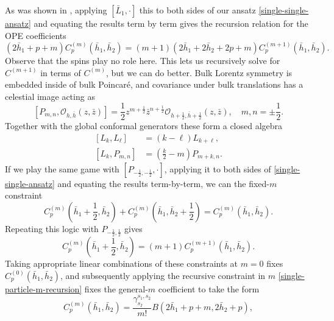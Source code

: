 \documentclass[11pt,letterpaper]{article}
\newcommand{\LP}{\left(}
\newcommand{\RP}{\right)}
\newcommand{\mc}[1]{\mathcal{#1}}
\begin{document}
As was shown in \cite{Himwich:2021dau}, applying $\left[ \bar{L}_1, \cdot \right]$ this to both sides of our ansatz \eqref{single-single-ansatz} and equating the results term by term gives the recursion relation for the OPE coefficients
\begin{equation} \label{single-particle-m-recursion}
\LP 2\bar{h}_1 +p+ m  \RP C_p^{(m)} (\bar{h}_1, \bar{h}_2) = (m +1)(2\bar{h}_1 + 2\bar{h}_2 + 2p + m) C_p^{(m+1)}(\bar{h}_1, \bar{h}_2).
\end{equation} 
Observe that the spins play no role here. This lets us recursively solve for $C^{(m+1)}$ in terms of $C^{(m)}$, but we can do better. Bulk Lorentz symmetry is embedded inside of bulk Poincar\'{e}, and covariance under bulk translations has a celestial image acting as \begin{equation}
\left[ P_{m,n}, \mc{O}_{h, \bar{h}}(z, \bar{z}) \right] = \frac{1}{2} z^{m + \frac{1}{2}} \bar{z}^{n + \frac{1}{2}} \mc{O}_{h + \frac{1}{2}, \bar{h} + \frac{1}{2}} (z, \bar{z}), \quad m, n = \pm \frac{1}{2}.
\end{equation}
Together with the global conformal generators these form a closed algebra \begin{equation}
\begin{aligned}
[L_k, L_\ell] & = (k - \ell)L_{k + \ell}, \\
[L_k, P_{m,n}] & = \LP \frac{k}{2} - m \RP P_{m+k, n}.
\end{aligned}
\end{equation}
If we play the same game with $\left[ P_{- \frac{1}{2}, - \frac{1}{2}}, \cdot \right]$, applying it to both sides of \eqref{single-single-ansatz} and equating the results term-by-term, we can the fixed-$m$ constraint \cite{Himwich:2021dau} \begin{equation}
C^{(m)}_p\LP \bar{h}_1 + \frac{1}{2}, \bar{h}_2 \RP + C^{(m)}_p\LP \bar{h}_1, \bar{h}_2 + \frac{1}{2} \RP = C^{(m)}_p\LP \bar{h}_1, \bar{h}_2 \RP .
\end{equation} 
Repeating this logic with $P_{- \frac{1}{2}, \frac{1}{2} }$ gives \begin{equation}
C^{(m)}_p\LP \bar{h}_1 + \frac{1}{2}, \bar{h}_2 \RP = (m+1) C^{(m+1)}_p\LP \bar{h}_1, \bar{h}_2 \RP.
\end{equation}
Taking appropriate linear combinations of these constraints at $m = 0$ fixes $C^{(0)}_p(\bar{h}_1, \bar{h}_2)$, and subsequently applying the recursive constraint in $m$ \eqref{single-particle-m-recursion} fixes the general-$m$ coefficient to take the form 
\begin{equation}
C^{(m)}_p(\bar{h}_1, \bar{h}_2) = \frac{\gamma_{s_I}^{s_1, s_2}}{m!} B( 2\bar{h}_1 + p+ m, 2\bar{h}_2+p),
\end{equation}
\end{document}
